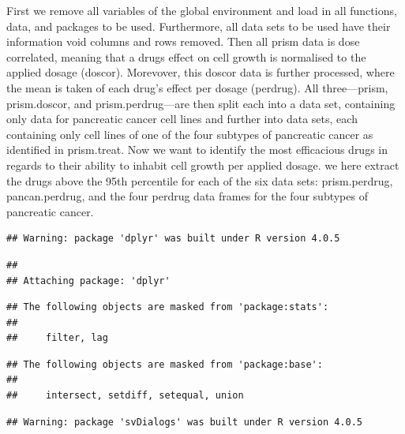 \documentclass[
]{article}
\newenvironment{Shaded}{\begin{snugshade}}{\end{snugshade}}
\newcommand{\DataTypeTok}[1]{\textcolor[rgb]{0.13,0.29,0.53}{#1}}
\newcommand{\KeywordTok}[1]{\textcolor[rgb]{0.13,0.29,0.53}{\textbf{#1}}}
\newcommand{\NormalTok}[1]{#1}
\newcommand{\OperatorTok}[1]{\textcolor[rgb]{0.81,0.36,0.00}{\textbf{#1}}}
\newcommand{\StringTok}[1]{\textcolor[rgb]{0.31,0.60,0.02}{#1}}
\begin{document}
First we remove all variables of the global environment and load in all
functions, data, and packages to be used. Furthermore, all data sets to
be used have their information void columns and rows removed. Then all
prism data is dose correlated, meaning that a drugs effect on cell
growth is normalised to the applied dosage (doscor). Morevover, this
doscor data is further processed, where the mean is taken of each drug's
effect per dosage (perdrug). All three---prism, prism.doscor, and
prism.perdrug---are then split each into a data set, containing only
data for pancreatic cancer cell lines and further into data sets, each
containing only cell lines of one of the four subtypes of pancreatic
cancer as identified in prism.treat. Now we want to identify the most
efficacious drugs in regards to their ability to inhabit cell growth per
applied dosage. we here extract the drugs above the 95th percentile for
each of the six data sets: prism.perdrug, pancan.perdrug, and the four
perdrug data frames for the four subtypes of pancreatic cancer.

\begin{Shaded}
\end{Shaded}

\begin{verbatim}
## Warning: package 'dplyr' was built under R version 4.0.5
\end{verbatim}

\begin{verbatim}
## 
## Attaching package: 'dplyr'
\end{verbatim}

\begin{verbatim}
## The following objects are masked from 'package:stats':
## 
##     filter, lag
\end{verbatim}

\begin{verbatim}
## The following objects are masked from 'package:base':
## 
##     intersect, setdiff, setequal, union
\end{verbatim}

\begin{verbatim}
## Warning: package 'svDialogs' was built under R version 4.0.5
\end{verbatim}
\end{document}

